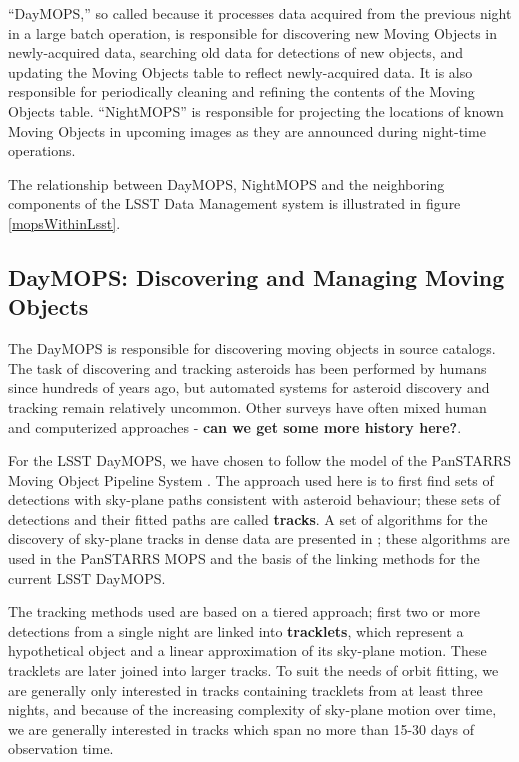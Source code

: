 \documentclass[12pt,preprint]{aastex}
\begin{document}
``DayMOPS,'' so called because it processes data acquired from the
previous night in a large batch operation, is responsible for
discovering new Moving Objects in newly-acquired data, searching old
data for detections of new objects, and updating the Moving Objects
table to reflect newly-acquired data. It is also responsible for
periodically cleaning and refining the contents of the Moving Objects
table.  ``NightMOPS'' is responsible for projecting the locations of known
Moving Objects in upcoming images as they are announced during
night-time operations.  

The relationship between DayMOPS, NightMOPS and the neighboring
components of the LSST Data Management system is illustrated in
figure \ref{mopsWithinLsst}.

\subsection{DayMOPS: Discovering and Managing Moving Objects}



The DayMOPS is responsible for discovering moving objects in source
catalogs.  The task of discovering and tracking asteroids has been
performed by humans since hundreds of years ago, but automated systems
for asteroid discovery and tracking remain relatively uncommon.  Other
surveys have often mixed human and computerized approaches -
\textbf{can we get some more history here?}.


For the LSST DayMOPS, we have chosen to follow the model of the
PanSTARRS Moving Object Pipeline System \citep{psMOPSDesign}.  The
approach used here is to first find sets of detections with sky-plane
paths consistent with asteroid behaviour; these sets of detections and
their fitted paths are called \textbf{tracks}.  A set of algorithms
for the discovery of sky-plane tracks in dense data are presented in
\citet{Kubica:2005:MTA:1081870.1081889}; these algorithms are used in
the PanSTARRS MOPS and the basis of the linking methods for the
current LSST DayMOPS.  

The tracking methods used are based on a tiered approach; first two or
more detections from a single night are linked into
\textbf{tracklets}, which represent a hypothetical object and a linear
approximation of its sky-plane motion.  These tracklets are later
joined into larger tracks.  To suit the needs of orbit fitting, we are
generally only interested in tracks containing tracklets from at least
three nights, and because of the increasing complexity of sky-plane
motion over time, we are generally interested in tracks which span no
more than 15-30 days of observation time.
\end{document}
